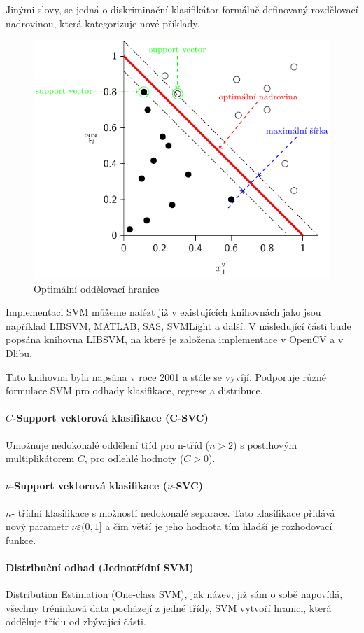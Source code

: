 Jinými slovy, se jedná o diskriminační klasifikátor formálně definovaný rozdělovací nadrovinou, která kategorizuje nové příklady.
\begin{figure}[H]
\centering
\includegraphics[width=.7\linewidth]{figures/svm.pdf}
\caption{Optimální oddělovací hranice}
\label{fig:svm}
\end{figure}

Implementaci SVM můžeme nalézt již v existujících knihovnách jako jsou například LIBSVM, MATLAB, SAS, SVMLight a další. V následující části bude popsána knihovna LIBSVM, na které je založena implementace v OpenCV a v Dlibu.  

Tato knihovna byla napsána v roce 2001 \cite{libsvm} a stále se vyvíjí. Podporuje různé formulace SVM pro odhady klasifikace, regrese a distribuce.

\paragraph*{$C$-Support vektorová klasifikace (C-SVC)}
Umožnuje nedokonalé oddělení tříd pro n-tříd ($n > 2$) s postihovým multiplikátorem $C$, pro odlehlé hodnoty ($C > 0$). \cite{csvmclass}

\paragraph*{$\nu$-Support vektorová klasifikace ($\nu$-SVC)}
$n$- třídní klasifikace s možností nedokonalé separace. Tato klasifikace přidává nový parametr $\nu \varepsilon (0,1]$ a čím větší je jeho hodnota tím hladší je rozhodovací funkce. \cite{nusvmsvrclass}

\paragraph*{Distribuční odhad (Jednotřídní SVM)}
Distribution Estimation (One-class SVM), jak název, již sám o sobě napovídá, všechny tréninková data pocházejí z jedné třídy, SVM vytvoří hranici, která odděluje třídu od zbývající části. \cite{oneclasssvm}

